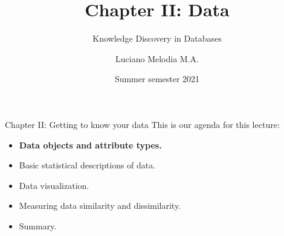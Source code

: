 \documentclass[aspectratio=169,t]{beamer}
\title[KDD]{Chapter II: Data}
\subtitle{Knowledge Discovery in Databases}
\author[L.~Melodia]{Luciano Melodia M.A.}
\institute[Department]{Evolutionary Data Management, Friedrich-Alexander University Erlangen-Nürnberg}
\date{Summer semester 2021}
\begin{document}
  \maketitle

  { 
    \begin{frame}{Chapter II: Getting to know your data}
    This is our agenda for this lecture:
        \begin{itemize}
            \item \textbf{Data objects and attribute types.}
            \item Basic statistical descriptions of data.
            \item Data visualization.
            \item Measuring data similarity and dissimilarity.
            \item Summary.
        \end{itemize}
    \end{frame}
  }
\end{document}
